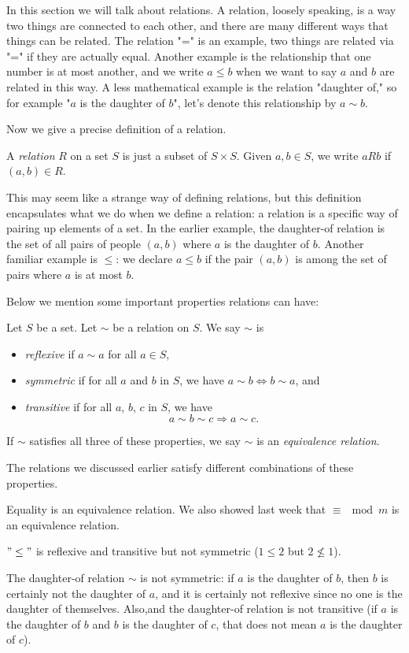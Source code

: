 \documentclass[11pt,dvipsnames]{book}
\numberwithin{equation}{section} %
\numberwithin{figure}{section} %
\numberwithin{table}{section} %
\begin{document}
In this section we will talk about relations. A relation, loosely speaking, is a way two things are connected to each other, and there are many different ways that things can be related. The relation "=" is an example, two things are related via "=" if they are actually equal. Another example is the relationship that one number is at most another, and we write $a\leq b$ when we want to say $a$ and $b$ are related in this way. A less mathematical example is the relation "daughter of," so for example "$a$ is the daughter of $b$", let's denote this relationship by $a\sim b$. 

Now we give a precise definition of a relation.

\begin{definition}
A {\it relation} $R$ on a set $S$ is just a subset of $S\times S$. Given $a,b\in S$, we write $aRb$ if $(a,b)\in R$.
\end{definition}

This may seem like a strange way of defining relations, but this definition encapsulates what we do when we define a relation: a relation is a specific way of pairing up elements of a set. In the earlier example, the daughter-of relation is the set of all pairs of people $(a,b)$ where $a$ is the daughter of $b$. Another familiar example is $\leq$: we declare $a\leq b$ if the pair $(a,b)$ is among the set of pairs where $a$ is at most $b$. 

Below we mention some important properties relations can have:

 \begin{definition}
 Let $S$ be a set. Let $\sim$ be a relation on $S$. We say $\sim$ is 
\begin{itemize}
\item {\it reflexive} if $a\sim a$ for all $a\in S$,
 \item {\it symmetric} if for all $a$ and $b$ in $S$,  we have $
a\sim b  \Longleftrightarrow  b\sim a$, and
 \item {\it transitive} if for all $a$, $b$, $c$ in $S$,  we have
\[
a\sim b\sim c\Longrightarrow  a\sim c.\]
\end{itemize}
If $\sim$ satisfies all three of these properties, we say $\sim$ is an {\it equivalence relation}.
\end{definition}

The relations we discussed earlier satisfy different combinations of these properties.

\begin{example}
\item Equality is an equivalence relation. We also showed last week that $\equiv \mod m$ is an equivalence relation. 
\item $"\leq"$ is reflexive and transitive but not symmetric ($1\leq 2$ but $2\not\leq 1$). 
\item The daughter-of relation $\sim$ is not symmetric: if $a$ is the daughter of $b$, then $b$ is certainly not the daughter of $a$, and it is certainly not reflexive since no one is the daughter of themselves. Also,and the daughter-of relation is not transitive (if $a$ is the daughter of $b$ and $b$ is the daughter of $c$, that does not mean $a$ is the daughter of $c$). 
\end{example}
\end{document}
